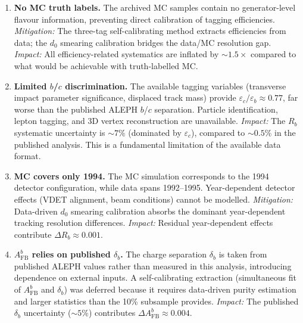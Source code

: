 \documentclass[11pt,a4paper]{article}
\begin{document}
\begin{enumerate}

\item \textbf{No MC truth labels.}
  The archived MC samples contain no generator-level flavour
  information, preventing direct calibration of tagging
  efficiencies.
  \textit{Mitigation:} The three-tag self-calibrating method
  extracts efficiencies from data; the $d_0$ smearing calibration
  bridges the data/MC resolution gap.
  \textit{Impact:} All efficiency-related systematics are
  inflated by $\sim 1.5\times$ compared to what would be
  achievable with truth-labelled MC.

\item \textbf{Limited $b$/$c$ discrimination.}
  The available tagging variables (transverse impact parameter
  significance, displaced track mass) provide
  $\varepsilon_c/\varepsilon_b \approx 0.77$, far worse than
  the published ALEPH $b$/$c$ separation.
  Particle identification, lepton tagging, and 3D vertex
  reconstruction are unavailable.
  \textit{Impact:} The $R_b$ systematic uncertainty is
  $\sim 7\%$ (dominated by $\varepsilon_c$), compared to
  $\sim 0.5\%$ in the published analysis.
  This is a fundamental limitation of the available data format.

\item \textbf{MC covers only 1994.}
  The MC simulation corresponds to the 1994 detector configuration,
  while data spans 1992--1995.
  Year-dependent detector effects (VDET alignment, beam conditions)
  cannot be modelled.
  \textit{Mitigation:} Data-driven $d_0$ smearing calibration
  absorbs the dominant year-dependent tracking resolution
  differences.
  \textit{Impact:} Residual year-dependent effects contribute
  $\Delta R_b \approx 0.001$.

\item \textbf{$A_\text{FB}^b$ relies on published $\delta_b$.}
  The charge separation $\delta_b$ is taken from published
  ALEPH values rather than measured in this analysis, introducing
  dependence on external inputs.
  A self-calibrating extraction (simultaneous fit of
  $A_\text{FB}^b$ and $\delta_b$) was deferred because it
  requires data-driven purity estimation and larger statistics
  than the 10\% subsample provides.
  \textit{Impact:} The published $\delta_b$ uncertainty ($\sim 5\%$)
  contributes $\Delta A_\text{FB}^b \approx 0.004$.


\end{enumerate}
\end{document}
